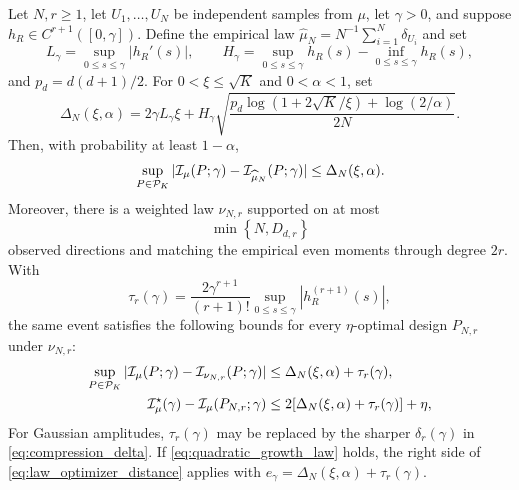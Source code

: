 \begin{corollary}
\label{cor:finite_sample}
Let $N,r\ge1$, let $U_1,\ldots,U_N$ be independent samples from $\mu$, let $\gamma>0$, and
suppose $h_R\in C^{r+1}([0,\gamma])$. Define the empirical law
$\widehat\mu_N=N^{-1}\sum_{i=1}^N\delta_{U_i}$ and set
\begin{equation}
L_\gamma=\sup_{0\le s\le\gamma}|h_R'(s)|,
\qquad
H_\gamma=\sup_{0\le s\le\gamma}h_R(s)
-\inf_{0\le s\le\gamma}h_R(s),
\end{equation}
and $p_d=d(d+1)/2$. For $0<\xi\le\sqrt K$ and $0<\alpha<1$, set
\begin{equation}
\Delta_N(\xi,\alpha)=2\gamma L_\gamma\xi
+H_\gamma\sqrt{\frac{p_d\log(1+2\sqrt K/\xi)+\log(2/\alpha)}{2N}}.
\label{eq:empirical_uniform_bound}
\end{equation}
Then, with probability at least $1-\alpha$,
\begin{equation}
\sup_{P\in\mathcal P_K}|\mathcal I_\mu(P;\gamma)
-\mathcal I_{\widehat\mu_N}(P;\gamma)|
\le\Delta_N(\xi,\alpha).
\label{eq:empirical_uniform_information}
\end{equation}
Moreover, there is a weighted law $\nu_{N,r}$ supported on at most
\begin{equation}
\min\left\{N,D_{d,r}\right\}
\end{equation}
observed directions and matching the empirical even moments through degree
$2r$. With
\begin{equation}
\tau_r(\gamma)=\frac{2\gamma^{r+1}}{(r+1)!}
\sup_{0\le s\le\gamma}|h_R^{(r+1)}(s)|,
\end{equation}
the same event satisfies the following bounds for every $\eta$-optimal design
$P_{N,r}$ under $\nu_{N,r}$:
\begin{align}
\sup_{P\in\mathcal P_K}|\mathcal I_\mu(P;\gamma)-\mathcal I_{\nu_{N,r}}(P;\gamma)|
&\le \Delta_N(\xi,\alpha)+\tau_r(\gamma),
\label{eq:sample_compressed_error}\\
\mathcal I_\mu^\star(\gamma)-\mathcal I_\mu(P_{N,r};\gamma)
&\le2[\Delta_N(\xi,\alpha)+\tau_r(\gamma)]+\eta,
\label{eq:sample_compressed_regret}
\end{align}
For Gaussian amplitudes, $\tau_r(\gamma)$ may be replaced by the sharper
$\delta_r(\gamma)$ in \eqref{eq:compression_delta}. If
\eqref{eq:quadratic_growth_law} holds, the right side of
\eqref{eq:law_optimizer_distance} applies with
$e_\gamma=\Delta_N(\xi,\alpha)+\tau_r(\gamma)$.
\end{corollary}
